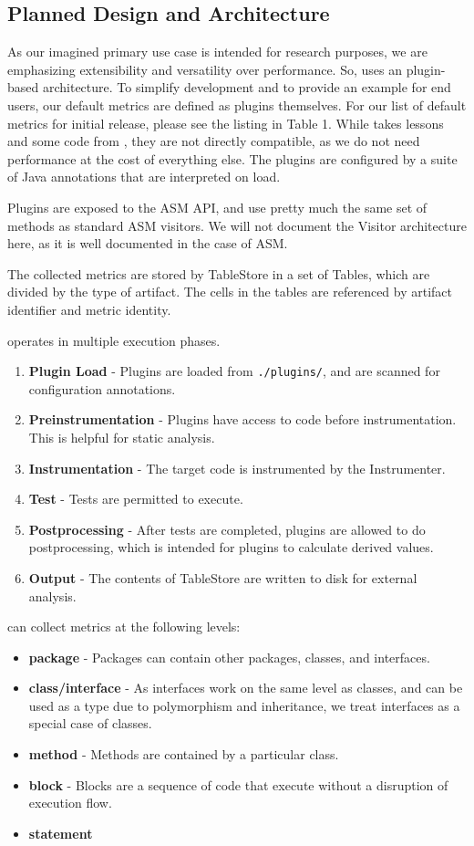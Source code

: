 \subsection{Planned Design and Architecture}
As our imagined primary use case is intended for research purposes, we are emphasizing extensibility and versatility over performance. So, \mt{} uses an plugin-based architecture. To simplify development and to provide an example for end users, our default metrics are defined as plugins themselves. For our list of default metrics for initial release, please see the listing in Table 1. While \mt{} takes lessons and some code from \ct{}, they are not directly compatible, as we do not need performance at the cost of everything else. The plugins are configured by a suite of Java annotations that are interpreted on load.

Plugins are exposed to the ASM API, and use pretty much the same set of methods as standard ASM visitors. We will not document the Visitor architecture here, as it is well documented in the case of ASM.

The collected metrics are stored by TableStore in a set of Tables, which are divided by the type of artifact. The cells in the tables are referenced by artifact identifier and metric identity.

\mt{} operates in multiple execution phases.
\begin{enumerate}
\item \textbf{Plugin Load} - Plugins are loaded from \texttt{./plugins/}, and are scanned for configuration annotations.
\item \textbf{Preinstrumentation} - Plugins have access to code before instrumentation. This is helpful for static analysis.
\item \textbf{Instrumentation} - The target code is instrumented by the Instrumenter.
\item \textbf{Test} - Tests are permitted to execute. 
\item \textbf{Postprocessing} - After tests are completed, plugins are allowed to do postprocessing, which is intended for plugins to calculate derived values.
\item \textbf{Output} - The contents of TableStore are written to disk for external analysis.
\end{enumerate}

\mt{} can collect metrics at the following levels:

\begin{itemize}
\item \textbf{package} - Packages can contain other packages, classes, and interfaces.
\item \textbf{class/interface} - As interfaces work on the same level as classes, and can be used as a type due to polymorphism and inheritance, we treat interfaces as a special case of classes.
\item \textbf{method} - Methods are contained by a particular class. 
\item \textbf{block} - Blocks are a sequence of code that execute without a disruption of execution flow.
\item \textbf{statement}
\end{itemize}

